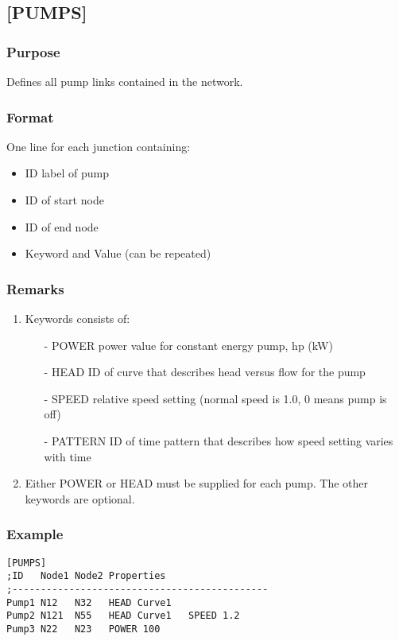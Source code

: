 \subsection{[PUMPS]}
  \subsubsection{Purpose}
  Defines all pump links contained in the network.
  \subsubsection{Format}
  One line for each junction containing:
  \begin{itemize}
    \item ID label of pump
    \item ID of start node
    \item ID of end node
    \item Keyword and Value (can be repeated)
  \end{itemize}
  \subsubsection{Remarks}
  \begin{enumerate}
    \item Keywords consists of:
    \begin{itemize}
        \item[-] POWER  power value for constant energy pump, hp (kW)
        \item[-] HEAD  ID of curve that describes head versus flow for the pump
        \item[-] SPEED  relative speed setting (normal speed is 1.0, 0 means pump is off)
        \item[-] PATTERN  ID of time pattern that describes how speed setting varies with time
    \end{itemize}
    \item Either POWER or HEAD must be supplied for each pump. The other keywords are optional.
  \end{enumerate}
  \subsubsection{Example}
\begin{verbatim}[PUMPS]
;ID   Node1 Node2 Properties
;---------------------------------------------
Pump1 N12   N32   HEAD Curve1
Pump2 N121  N55   HEAD Curve1   SPEED 1.2
Pump3 N22   N23   POWER 100
\end{verbatim}


